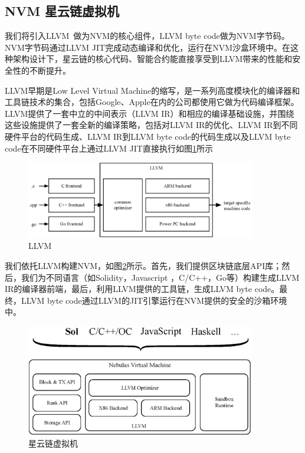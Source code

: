 \subsection{NVM 星云链虚拟机}
\label{sec:nvm}

我们将引入LLVM~\cite{llvm}做为NVM的核心组件，LLVM byte code做为NVM字节码。NVM字节码通过LLVM JIT完成动态编译和优化，运行在NVM沙盒环境中。在这种架构设计下，星云链的核心代码、智能合约能直接享受到LLVM带来的性能和安全性的不断提升。

LLVM早期是Low Level Virtual
Machine的缩写，是一系列高度模块化的编译器和工具链技术的集合，包括Google、Apple在内的公司都使用它做为代码编译框架。LLVM提供了一套中立的中间表示（LLVM
IR）和相应的编译基础设施，并围绕这些设施提供了一套全新的编译策略，包括对LLVM
IR的优化、LLVM IR到不同硬件平台的代码生成、LLVM IR到LLVM byte
code的代码生成以及LLVM byte code在不同硬件平台上通过LLVM
JIT直接执行如图\ref{fig:llvm}所示


\begin{figure}[h]
\centering
\includegraphics[width=10cm]{./figs/llvm}
\caption{LLVM}
\label{fig:llvm}
\end{figure}

我们依托LLVM构建NVM，如图\ref{fig:nvm}所示。首先，我们提供区块链底层API库；然后，我们为不同语言（如Solidity，Javascript
，C/C++，Go等）构建生成LLVM
IR的编译器前端，最后，利用LLVM提供的工具链，生成LLVM byte code。最终，LLVM byte
code通过LLVM的JIT引擎运行在NVM提供的安全的沙箱环境中。

\begin{figure}[h]
\centering
\includegraphics[width=10cm]{./figs/nvm}
\caption{星云链虚拟机}
\label{fig:nvm}
\end{figure}


